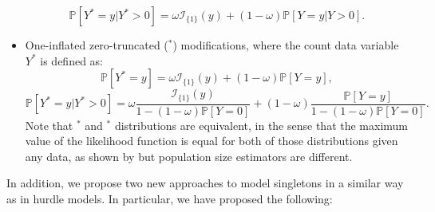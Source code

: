 \documentclass[nojss]{jss}
\newcommand{\1}{\mathcal{I}} \newcommand{\bZero}{\boldsymbol{0}}
\begin{document}
\begin{itemize}
\begin{equation*}
    \end{equation*}
    \begin{equation*}
        \mathbb{P}\left[Y^{\ast}=y|Y^{\ast}>0\right]=\omega\mathcal{I}_{\{1\}}(y)+(1-\omega)\mathbb{P}[Y=y|Y>0].
    \end{equation*}
    \item One-inflated zero-truncated ($^\ast$) modifications, where the count data variable $Y^{\ast}$ is defined as:
    \begin{equation*}
        \mathbb{P}\left[Y^{\ast}=y\right] = \omega \mathcal{I}_{\{1\}}(y)+(1-\omega)\mathbb{P}[Y=y],
    \end{equation*}
    \begin{equation*}
        \mathbb{P}\left[Y^{\ast}=y|Y^{\ast}>0\right] =
        \omega\frac{\mathcal{I}_{\{1\}}(y)}{1-(1-\omega)\mathbb{P}[Y=0]}+
        (1-\omega)\frac{\mathbb{P}[Y=y]}{1-(1-\omega)\mathbb{P}[Y=0]}.
    \end{equation*}
    Note that $^\ast$ and $^\ast$ distributions are equivalent, in the sense that the maximum value of the likelihood function is equal for both of those distributions given any data, as shown by \cite{bohning2023equivalence} but population size estimators are different.
\end{itemize}

In addition, we propose two new approaches to model singletons in a
similar way as in hurdle models. In particular, we have proposed the
following:
\end{document}
